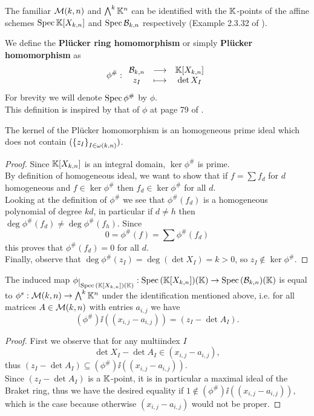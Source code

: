 \begin{remark}
The familiar $\mathcal{M}(k,n)$ and $\bigwedge^k\mathbb{K}^n$ can be identified with the $\mathbb{K}$-points of the affine schemes $\mathrm{Spec}\, \mathbb{K}[X_{k,n}]$ and $\mathrm{Spec}\, \mathcal{B}_{k,n}$ respectively (Example 2.3.32 of \cite{QingLiu}).
\end{remark}

\begin{definition}
We define the \textbf{Pl\"ucker ring homomorphism} or simply \textbf{Pl\"ucker homomorphism} as
\[\phi^\#:\begin{array}{ccc} {\mathcal{B}_{k,n}} & \longrightarrow & {\mathbb{K}[X_{k,n}]}\\ {z_I} & \longmapsto & {\det X_I} \end{array}\]
For brevity we will denote $\mathrm{Spec}\, \phi^\#$ by $\phi$.\\
This definition is inspired by that of $\phi$ at page 79 of \cite{matroids}.
\end{definition}

\begin{proposition}
The kernel of the Pl\"ucker homomorphism is an homogeneous prime ideal which does not contain $(\left\{{z_I}\right\}_{I\in\omega(k,n)})$.
\end{proposition}
\begin{proof}
Since $\mathbb{K}[X_{k,n}]$ is an integral domain, $\ker\phi^\#$ is prime.\\
By definition of homogeneous ideal, we want to show that if $f=\sum f_d$ for $d$ homogeneous and $f\in \ker\phi^\#$ then $f_d\in \ker \phi^\#$ for all $d$.\\
Looking at the definition of $\phi^\#$ we see that $\phi^\#(f_d)$ is a homogeneous polynomial of degree $kd$, in particular if $d\neq h$ then $\deg \phi^\#(f_d)\neq \deg \phi^\#(f_h)$. Since
\[0=\phi^\#(f)=\sum \phi^\#(f_d)\]
this proves that $\phi^\#(f_d)=0$ for all $d$.\\
Finally, observe that $\deg\phi^\#(z_I)=\deg(\det X_I)=k>0$, so $z_I\notin \ker\phi^\#$.
\end{proof}

\begin{proposition}\label{PluckerRingHomomorphismWorksForKPoints}
The induced map $\phi\res{\Spec(\K[X_{k,n}])(\K)}:\Spec(\K[X_{k,n}])(\K)\to \Spec(\Bc_{k,n})(\K)$ is equal to $\phi^s:\mathcal{M}(k,n)\to \bigwedge^k\mathbb{K}^n$ under the identification mentioned above, i.e. for all matrices $A\in\mathcal{M}(k,n)$ with entries $a_{i,j}$ we have
\[(\phi^\#)\ii((x_{i,j}-a_{i,j}))=(z_I-\det A_I).\]
\end{proposition}
\begin{proof}
First we observe that for any multiindex $I$
\[\det X_I-\det A_I\in (x_{i,j}-a_{i,j}),\]
thus $(z_I-\det A_I)\subseteq (\phi^\#)\ii((x_{i,j}-a_{i,j}))$.\\
Since $(z_I-\det A_I)$ is a $\mathbb{K}$-point, it is in particular a maximal ideal of the Braket ring, thus we have the desired equality if $1\notin (\phi^\#)\ii((x_{i,j}-a_{i,j}))$, which is the case because otherwise $(x_{i,j}-a_{i,j})$ would not be proper.
\end{proof}

